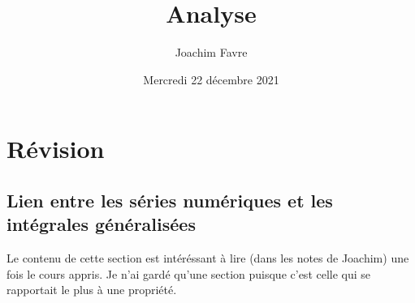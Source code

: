\documentclass[a4paper]{article}
\title{Analyse}
\author{Joachim Favre}
\date{Mercredi 22 décembre 2021}
\begin{document}
\maketitle


\section{Révision}

\subsection[Séries numériques et intégrales généralisées]{Lien entre les séries numériques et les intégrales généralisées}

 {
    Le contenu de cette section est intéréssant à lire (dans les notes de Joachim) une fois le cours appris. Je n'ai gardé qu'une section puisque c'est celle qui se rapportait le plus à une propriété.
}
\end{document}
